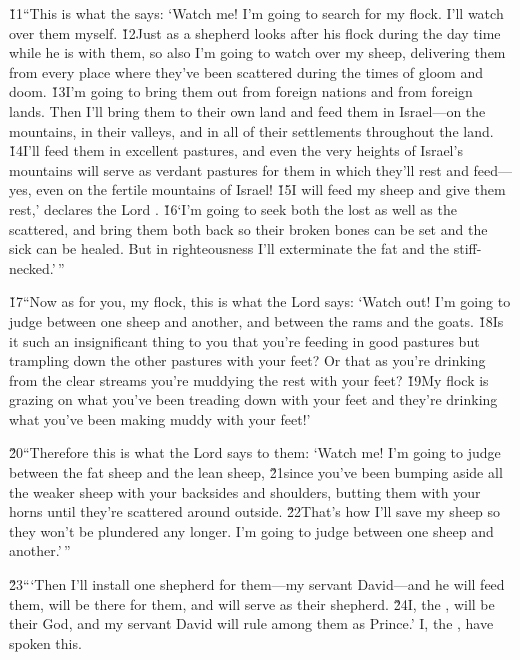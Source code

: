 \v{11}``This is what the  says: `Watch me! I'm going to search for my flock. I'll watch over them myself. \v{12}Just as a shepherd looks after his flock during the day time while he is with them, so also I'm going to watch over my sheep, delivering them from every place where they've been scattered during the times of gloom and doom. \v{13}I'm going to bring them out from foreign nations and from foreign lands. Then I'll bring them to their own land and feed them in Israel---on the mountains, in their valleys, and in all of their settlements throughout the land. \v{14}I'll feed them in excellent pastures, and even the very heights of Israel's mountains will serve as verdant pastures for them in which they'll rest and feed---yes, even on the fertile mountains of Israel! \v{15}I will feed my sheep and give them rest,' declares the Lord . \v{16}`I'm going to seek both the lost as well as the scattered, and bring them both back so their broken bones can be set and the sick can be healed. But in righteousness I'll exterminate the fat and the stiff-necked.'\,''

\v{17}``Now as for you, my flock, this is what the Lord  says: `Watch out! I'm going to judge between one sheep and another, and between the rams and the goats. \v{18}Is it such an insignificant thing to you that you're feeding in good pastures but trampling down the other pastures with your feet? Or that as you're drinking from the clear streams you're muddying the rest with your feet? \v{19}My flock is grazing on what you've been treading down with your feet and they're drinking what you've been making muddy with your feet!'

\v{20}``Therefore this is what the Lord  says to them: `Watch me! I'm going to judge between the fat sheep and the lean sheep, \v{21}since you've been bumping aside all the weaker sheep with your backsides and shoulders, butting them with your horns until they're scattered around outside. \v{22}That's how I'll save my sheep so they won't be plundered any longer. I'm going to judge between one sheep and another.'\,''

\v{23}```Then I'll install one shepherd for them---my servant David---and he will feed them, will be there for them, and will serve as their shepherd. \v{24}I, the , will be their God, and my servant David will rule among them as Prince.' I, the , have spoken this.

